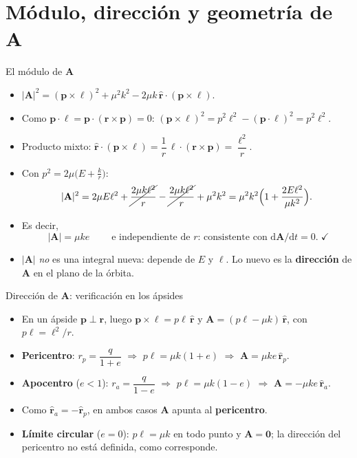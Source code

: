 \documentclass[aspectratio=169]{beamer}
\newcommand{\dd}{\mathrm{d}}
\newcommand{\vr}{\mathbf r}
\newcommand{\vp}{\mathbf p}
\newcommand{\vA}{\mathbf A}
\newcommand{\vl}{\boldsymbol\ell}
\newcommand{\rh}{\hat{\mathbf r}}
\begin{document}
\section[Módulo y geometría]{Módulo, dirección y geometría de $\mathbf A$}

\begin{frame}{El módulo de $\vA$}
\begin{itemize}
  \item<1-> $|\vA|^{2}=(\vp\times\vl)^{2}+\mu^{2}k^{2}-2\mu k\,\rh\cdot(\vp\times\vl)$.
  \item<2-> Como $\vp\cdot\vl=\vp\cdot(\vr\times\vp)=0$:\;
        $(\vp\times\vl)^{2}=p^{2}\ell^{2}-(\vp\cdot\vl)^{2}=p^{2}\ell^{2}$.
  \item<3-> Producto mixto: $\rh\cdot(\vp\times\vl)=\dfrac1r\,\vl\cdot(\vr\times\vp)=\dfrac{\ell^{2}}{r}$.
  \item<4-> Con $p^{2}=2\mu\big(E+\tfrac kr\big)$:
  \[
    |\vA|^{2}=2\mu E\ell^{2}+\cancel{\frac{2\mu k\ell^{2}}{r}}
      -\cancel{\frac{2\mu k\ell^{2}}{r}}+\mu^{2}k^{2}
      =\mu^{2}k^{2}\Big(1+\frac{2E\ell^{2}}{\mu k^{2}}\Big).
  \]
  \item<5-> Es decir,
  \[
    \boxed{\;|\vA|=\mu k e\;}
    \qquad\text{e independiente de } r\text{: consistente con } \dd\vA/\dd t=0.\;\checkmark
  \]
  \item<6-> $|\vA|$ \emph{no} es una integral nueva: depende de $E$ y $\ell$.
        Lo nuevo es la \textbf{dirección} de $\vA$ en el plano de la órbita.
\end{itemize}
\end{frame}

\begin{frame}{Dirección de $\vA$: verificación en los ápsides}
\begin{itemize}
  \item<1-> En un ápside $\vp\perp\vr$, luego $\vp\times\vl=p\ell\,\rh$ y
        $\vA=(p\ell-\mu k)\,\rh$, con $p\ell=\ell^{2}/r$.
  \item<2-> \textbf{Pericentro}: $r_p=\dfrac{q}{1+e}$ $\Rightarrow$
        $p\ell=\mu k(1+e)$ $\Rightarrow$ $\vA=\mu k e\,\rh_p$.
  \item<3-> \textbf{Apocentro} ($e<1$): $r_a=\dfrac{q}{1-e}$ $\Rightarrow$
        $p\ell=\mu k(1-e)$ $\Rightarrow$ $\vA=-\mu k e\,\rh_a$.
  \item<4-> Como $\rh_a=-\rh_p$, en ambos casos $\vA$ apunta al \textbf{pericentro}. \checkmark
  \item<5-> \textbf{Límite circular} ($e=0$): $p\ell=\mu k$ en todo punto y $\vA=\mathbf 0$;
        la dirección del pericentro no está definida, como corresponde.
\end{itemize}
\end{frame}
\end{document}
